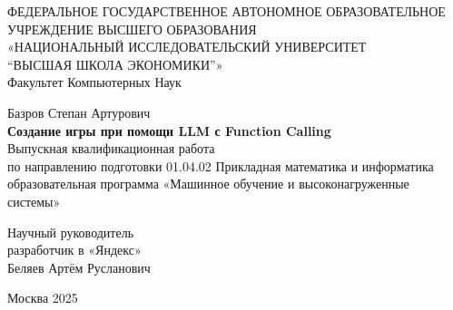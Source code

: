 \documentclass[14pt]{extarticle}
\begin{document}
	\begin{titlepage}
		\begin{center}
			{\normalsize{ФЕДЕРАЛЬНОЕ ГОСУДАРСТВЕННОЕ АВТОНОМНОЕ ОБРАЗОВАТЕЛЬНОЕ УЧРЕЖДЕНИЕ ВЫСШЕГО ОБРАЗОВАНИЯ}}\\
                \vspace{0.1cm}
			{\normalsize{«НАЦИОНАЛЬНЫЙ ИССЛЕДОВАТЕЛЬСКИЙ УНИВЕРСИТЕТ \\ “ВЫСШАЯ ШКОЛА ЭКОНОМИКИ”»}}\\
			\vspace{1cm}
			{\normalsize{Факультет Компьютерных Наук}}\\
                \vspace{1.5cm}
                

                {\normalsize{Базров Степан Артурович}}\\
                \vspace{0.15cm}
			{\normalsize{\textbf{Создание игры при помощи LLM с Function Calling}}}\\ 
                \vspace{0.15cm}
                {\normalsize{Выпускная квалификационная работа}}\\
                {\normalsize{по направлению подготовки 01.04.02 Прикладная математика и информатика}}\\
                {\normalsize{образовательная программа «Машинное обучение и высоконагруженные системы»}} \\
            \end{center}
        \vspace{4.2cm}
        \begin{minipage}{0.4\textwidth}
        \hfill
	\end{minipage}
	\hspace{2cm}
	\begin{minipage}{0.4\textwidth}
		\begin{flushleft}
			{\normalsize{{Научный руководитель}}}\\
                {\normalsize{разработчик в «Яндекс»}}\\
                {\normalsize{Беляев Артём Русланович}} \\
		\end{flushleft}
	\end{minipage}
            \vspace{4.0cm}
        \begin{center}
            Москва 2025
        \end{center}
        \restoregeometry
	\end{titlepage}
\tableofcontents
\newpage
\end{document}
